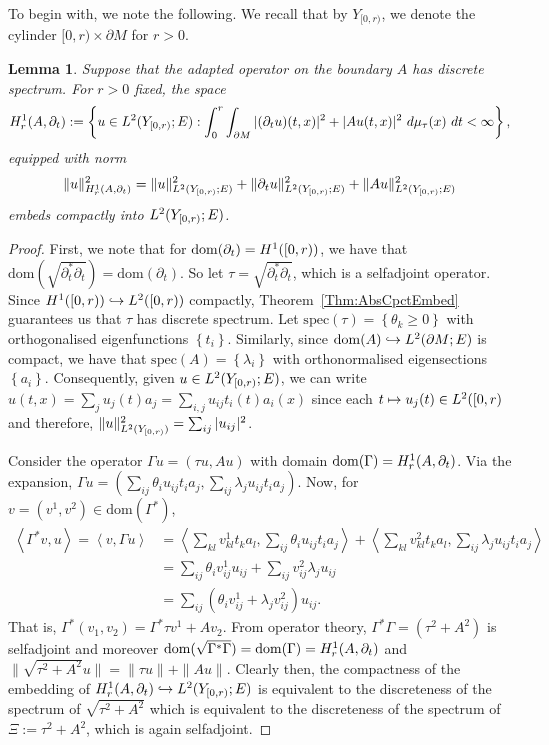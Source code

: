 \documentclass[a4paper,10pt,reqno]{amsart}
\newcommand{\spec}{\mathrm{spec}}%
\newcommand{\dbrac}[1]{\left\{#1\right\}}
\newcommand{\modulus}[1]{|#1|}
\newcommand{\norm}[1]{\| #1 \|}%
\newcommand{\set}[1]{\dbrac{#1}}
\newcommand{\Lp}[2][{}]{{\rm L}^{#2}_{\rm #1}}%
\newcommand{\Hard}[2][{}]{{\rm H}^{#2}_{\rm #1}}%
\newcommand{\SobH}[2][{}]{\Hard[#1]{\rm #2}}
\newcommand{\embed}{\hookrightarrow}%
\newcommand{\dom}{\mathrm{dom}}
\newcommand{\inprod}[1]{\left\langle #1 \right\rangle}%
\newcommand{\dM}{\partial M}
\newtheorem{lemma}[theorem]{Lemma}
\theoremstyle{definition}
\begin{document}
To begin with, we note the following.
We recall that by $Y_{[0,r)}$, we denote the cylinder $[0,r) \times\dM$ for $r > 0$. 

\begin{lemma}
Suppose that the adapted operator on the boundary $A$ has discrete spectrum.
For $r > 0$ fixed, the space 
$$ \SobH[r]{1}(A,\partial_t) := \set{u \in \Lp{2}(Y_{[0,r)};E): \int_{0}^r \int_{\dM} \modulus{(\partial_t u)(t,x)}^2 + \modulus{Au(t,x)}^2\ d\mu_{\tau}(x)\ dt < \infty},$$
equipped with norm
$$ \norm{u}_{\SobH[r]{1}(A,\partial_t)}^2 = \norm{u}_{\Lp{2}(Y_{[0,r)};E)}^2 + \norm{\partial_t u}_{\Lp{2}(Y_{[0,r)};E)}^2 + \norm{Au}_{\Lp{2}(Y_{[0,r)};E)}^2$$ 
embeds compactly into $\Lp{2}(Y_{[0,r)}; E)$. 
\end{lemma}
\begin{proof}
First, we note that for $\dom(\partial_t) = \SobH{1}([0,r))$, we have that $\dom(\sqrt{\partial_t^\ast \partial_t}) = \dom(\partial_t)$.
So let $\tau = \sqrt{\partial_t^\ast \partial_t}$, which is a selfadjoint operator. 
Since $\SobH{1}([0,r)) \embed \Lp{2}([0,r))$ compactly,  Theorem~\ref{Thm:AbsCpctEmbed} guarantees us that $\tau$ has discrete spectrum. 
Let $\spec(\tau) = \set{\theta_k \geq 0}$ with orthogonalised eigenfunctions $\set{t_i}$.
Similarly, since $\dom(A) \embed \Lp{2}(\dM;E)$ is compact, we have that $\spec(A) = \set{ \lambda_i}$ with  orthonormalised eigensections $\set{a_i}$.
Consequently, given $u \in \Lp{2}(Y_{[0,r)};E)$, we can write $u(t,x) = \sum_{j} u_j(t) a_j = \sum_{i,j} u_{ij} t_i (t) a_i(x)$ since each $t \mapsto u_j(t) \in \Lp{2}([0,r)$ and therefore, $\norm{u}_{\Lp{2}(Y_{[0,r)})}^2 = \sum_{ij} \modulus{u_{ij}}^2$.

Consider the operator $\Gamma u = (\tau u, Au)$ with domain $\dom(\Gamma) = \SobH[r]{1}(A,\partial_t)$.
Via the expansion, $\Gamma u = (\sum_{ij} \theta_i u_{ij} t_i a_j, \sum_{ij} \lambda_j u_{ij} t_i a_j)$.
Now, for $v = (v^1, v^2) \in \dom(\Gamma^\ast)$, 
\begin{align*}  
\inprod{\Gamma^\ast v, u} 
=
\inprod{v, \Gamma u} 
&=
\inprod{\sum_{kl} v^1_{kl} t_k a_l, \sum_{ij} \theta_i u_{ij} t_i a_j} + \inprod{\sum_{kl} v^2_{kl} t_k a_l, \sum_{ij} \lambda_j u_{ij} t_i a_j} \\ 
&=
\sum_{ij}  \theta_i v^1_{ij} u_{ij} + \sum_{ij} v^2_{ij} \lambda_j u_{ij} \\ 
&= \sum_{ij} (\theta_i v^1_{ij} + \lambda_j v^2_{ij}) u_{ij}.
\end{align*}
That is,  $\Gamma^\ast (v_1, v_2) = \Gamma^\ast \tau v^1 + A v_2$.
From operator theory,  $\Gamma^\ast \Gamma  = (\tau^2 + A^2)$ is selfadjoint and moreover $\dom(\sqrt{\Gamma^\ast \Gamma}) = \dom(\Gamma) = \SobH[r]{1}(A,\partial_t)$ and $\norm{\sqrt{\tau^2 +A^2} u} = \norm{\tau u} + \norm{Au}$.
Clearly then, the compactness of the embedding of $\SobH[r]{1}(A,\partial_t) \embed \Lp{2}(Y_{[0,r)};E)$ is equivalent to the discreteness of the spectrum of $\sqrt{\tau^2 + A^2}$ which is equivalent to the discreteness of the spectrum of  $\Xi := \tau^2 + A^2$, which is again selfadjoint.


\end{proof}
\end{document}
